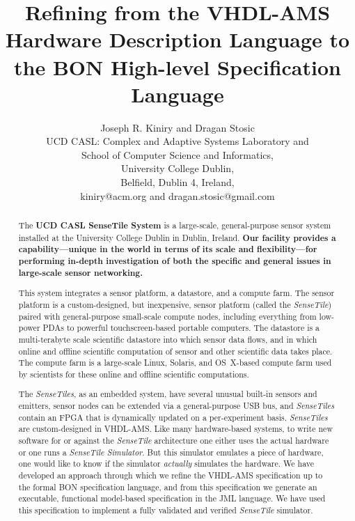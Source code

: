 \documentclass{article}
\newcommand{\ST}{\emph{SenseTile}\xspace}
\newcommand{\STs}{\emph{SenseTiles}\xspace}
\newcommand{\STS}{\emph{SenseTile Simulator}\xspace}
\begin{document}
\title{Refining from the VHDL-AMS Hardware Description Language 
to the BON High-level Specification Language}

\author{Joseph R. Kiniry and Dragan Stosic\\
UCD CASL: Complex and Adaptive Systems Laboratory and\\
School of Computer Science and Informatics,\\
University College Dublin,\\
Belfield, Dublin 4, Ireland,\\
kiniry@acm.org and dragan.stosic@gmail.com\\
}

\maketitle

\begin{abstract}

The \textbf{UCD CASL SenseTile System} is a large-scale, general-purpose
sensor system installed at the University College Dublin in Dublin,
Ireland.  \textbf{Our facility provides a capability---unique in the world in
terms of its scale and flexibility---for performing in-depth
investigation of both the specific and general issues in large-scale
sensor networking.}

This system integrates a sensor platform, a datastore, and a compute
farm.  The sensor platform is a custom-designed, but inexpensive,
sensor platform (called the \ST) paired with general-purpose
small-scale compute nodes, including everything from low-power PDAs to
powerful touchscreen-based portable computers.  The datastore is a
multi-terabyte scale scientific datastore into which sensor data
flows, and in which online and offline scientific computation of
sensor and other scientific data takes place.  The compute farm is a
large-scale Linux, Solaris, and OS~X-based compute farm used by
scientists for these online and offline scientific computations.

The \STs, as an embedded system, have several unusual built-in sensors
and emitters, sensor nodes can be extended via a general-purpose USB bus,
and \STs contain an FPGA that is dynamically updated on a per-experiment
basis.  \STs are custom-designed in VHDL-AMS.  Like many hardware-based systems,
 to write new software for or against the \ST architecture one either uses
the actual hardware or one runs a \STS.  But this simulator emulates a
piece of hardware, one would like to know if the simulator
\emph{actually} simulates the hardware.  We have developed an approach
through which we refine the VHDL-AMS specification up to the formal BON
specification language, and from this specification we generate an
executable, functional model-based specification in the JML language.
We have used this specification to implement a fully validated and
verified \ST simulator.

\end{abstract}
\end{document}
